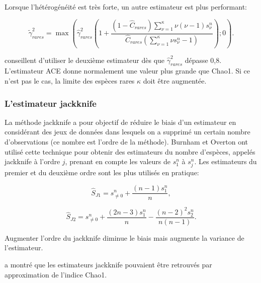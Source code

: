 \documentclass[
  11pt,
  french,
  a4paper,
  extrafontsizes,onecolumn,openright
  ]{memoir}
\newlength{\rf}
\begin{document}
Lorsque l'hétérogénéité est très forte, un autre estimateur est plus performant:

\begin{equation}
  \label{eq:ACEcv2}
  \tilde{\gamma}^{2}_\mathit{rares} = \max\left({\widehat{\gamma}}^2_\mathit{rares}\left(1+\frac{\left(1-{\hat{C}}_\mathit{rares}\right)\sum^{\kappa}_{\nu=1}{\nu\left(\nu -1\right){s^{n}_{\nu}}}}{{\hat{C}}_\mathit{rares}\left(\sum^{\kappa}_{\nu =1}{\nu s^{n}_{\nu}-1}\right)}\right); 0 \right).
\end{equation}

\textcite{Chao2010a} conseillent d'utiliser le deuxième estimateur dès que \({\widehat{\gamma}}^2_\mathit{rares}\) dépasse 0,8.
L'estimateur ACE donne normalement une valeur plus grande que Chao1.
Si ce n'est pas le cas, la limite des espèces rares \(\kappa\) doit être augmentée.

\subsubsection{L'estimateur jackknife}\label{lestimateur-jackknife}

La méthode jackknife a pour objectif de réduire le biais d'un estimateur en considérant des jeux de données dans lesquels on a supprimé un certain nombre d'observations (ce nombre est l'ordre de la méthode).
Burnham et Overton \autocite*{Burnham1978,Burnham1979} ont utilisé cette technique pour obtenir des estimateurs du nombre d'espèces, appelés jackknife à l'ordre \(j\), prenant en compte les valeurs de \(s^{n}_{1}\) à \(s^{n}_{j}\).
Les estimateurs du premier et du deuxième ordre sont les plus utilisés en pratique:

\begin{equation}
  \label{eq:Jack1}
  \hat{S}_\mathit{J1} = {s^{n}_{\ne 0}} + \frac{\left(n-1\right){s^{n}_{1}}}{n},
\end{equation}

\begin{equation} 
  \label{eq:Jack2}
  \hat{S}_\mathit{J2} = {s^{n}_{\ne 0}} + \frac{\left(2n-3\right){s^{n}_{1}}}{n} - \frac{{\left(n-2\right)}^{2}s^{n}_{2}}{n\left(n-1\right)}.
\end{equation}

Augmenter l'ordre du jackknife diminue le biais mais augmente la variance de l'estimateur.

\textcite{Chao1984} a montré que les estimateurs jackknife pouvaient être retrouvés par approximation de l'indice Chao1.
\end{document}
